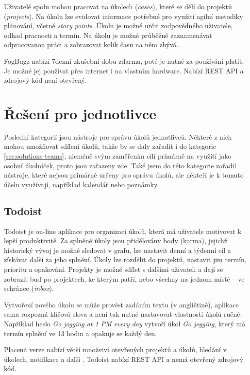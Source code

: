 \documentclass[thesis=B,czech]{FITthesis}[2012/06/26]
\begin{document}
			Uživatelé spolu mohou pracovat na úkolech (\textit{cases}), které se dělí do projektů (\textit{projects}). Na úkolu lze evidovat informace potřebné pro využití agilní metodiky plánování, včetně \textit{story points}. Úkolu je možné určit zodpovědného uživatele, odhad pracnosti a termín. Na úkolu je možné průběžně zaznamenávat odpracovanou práci a zobrazovat kolik času na něm zbývá.
			
			FogBugz nabízí 7denní zkušební dobu zdarma, poté je nutné za používání platit. Je možné jej používat přes internet i na vlastním hardware. Nabízí REST API a zdrojový kód není otevřený.

	\section{Řešení pro jednotlivce}
		\label{sec:solutions-individuals}
		Poslední kategorií jsou nástroje pro správu úkolů jednotlivců. Některé z nich mohou umožňovat sdílení úkolů, takže by se daly zařadit i do kategorie \ref{sec:solutions-teams}, nicméně svým zaměřením cílí primárně na využití jako osobní úkolníček, proto jsou zařazeny zde. Také jsem do této kategorie zařadil nástroje, které nejsou primárně určeny pro správu úkolů, ale někteří je k tomuto účelu využívají, například kalendář nebo poznámky.
		
		\subsection{Todoist}
			Todoist \cite{todoist} je on-line aplikace pro organizaci úkolů, která má uživatele motivovat k lepší produktivitě. Za splněné úkoly jsou přidělovány body (karma), jejichž historický vývoj je možné sledovat v grafu, lze nastavit denní a týdenní cíl a získávat další  za jeho splnění. Úkoly lze rozdělit do projektů, nastavit jim termín, prioritu a opakování. Projekty je možné sdílet s dalšími uživateli a dají se zobrazit buď po projektech, ke kterým patří, nebo všechny na jednom místě -- ve schránce (\textit{inbox}). 
			
			Vytvoření nového úkolu se může provést zadáním textu (v angličtině), aplikace sama rozpozná klíčová slova a není tak nutné nastavovat vlastnosti úkolů ručně. Například heslo \textit{Go jogging at 1 PM every day} vytvoří úkol \textit{Go jogging}, který má termín splnění ve 13 hodin a opakuje se každý den. 
			
			Placená verze nabízí větší množství otevřených projektů a úkolů, hledání v úkolech, notifikace a další \cite{todoist-compare-premium}. Todoist nabízí REST API \cite{todoist-api} a nemá otevřený zdrojový kód.
			
\end{document}

